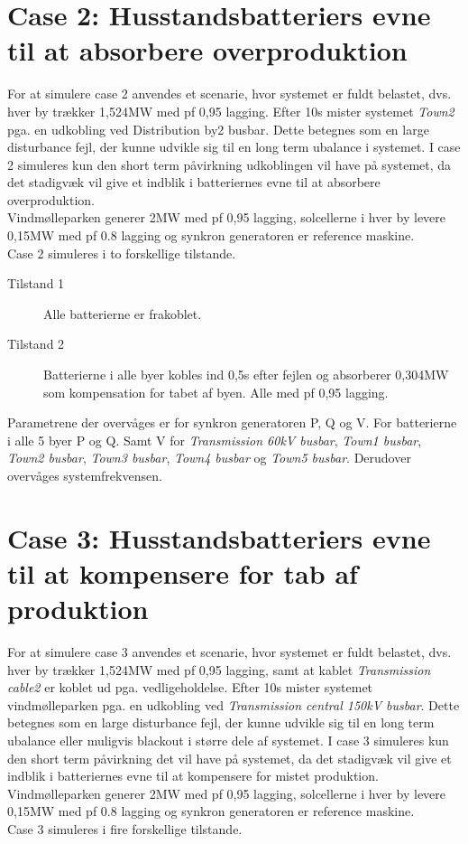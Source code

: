 \section{Case 2: Husstandsbatteriers evne til at absorbere overproduktion}
\label{SimCase2}
For at simulere case 2 anvendes et scenarie, hvor systemet er fuldt belastet, dvs. hver by trækker 1,524MW med pf 0,95 lagging. Efter 10s mister systemet \textit{Town2} pga. en udkobling ved Distribution by2 busbar. Dette betegnes som en large disturbance fejl, der kunne udvikle sig til en long term ubalance i systemet. I case 2 simuleres kun den short term påvirkning udkoblingen vil have på systemet, da det stadigvæk vil give et indblik i batteriernes evne til at absorbere overproduktion.\\
Vindmølleparken generer 2MW med pf 0,95 lagging, solcellerne i hver by levere 0,15MW med pf 0.8 lagging og synkron generatoren er reference maskine.\\
Case 2 simuleres i to forskellige tilstande.

\begin{description}
	\item[Tilstand 1] Alle batterierne er frakoblet.
	\item[Tilstand 2] Batterierne i alle byer kobles ind 0,5s efter fejlen og absorberer 0,304MW som kompensation for tabet af byen. Alle med pf 0,95 lagging.
\end{description}

Parametrene der overvåges er for synkron generatoren P, Q og V.
For batterierne i alle 5 byer P og Q. Samt V for \textit{Transmission 60kV busbar}, \textit{Town1 busbar}, \textit{Town2 busbar}, \textit{Town3 busbar}, \textit{Town4 busbar} og \textit{Town5 busbar}.
Derudover overvåges systemfrekvensen.

\section{Case 3: Husstandsbatteriers evne til at kompensere for tab af produktion}
\label{SimCase3}
For at simulere case 3 anvendes et scenarie, hvor systemet er fuldt belastet, dvs. hver by trækker 1,524MW med pf 0,95 lagging, samt at kablet \textit{Transmission cable2} er koblet ud pga. vedligeholdelse. Efter 10s mister systemet vindmølleparken pga. en udkobling ved \textit{Transmission central 150kV busbar}. Dette betegnes som en large disturbance fejl, der kunne udvikle sig til en long term ubalance eller muligvis blackout i større dele af systemet. I case 3 simuleres kun den short term påvirkning det vil have på systemet, da det stadigvæk vil give et indblik i batteriernes evne til at kompensere for mistet produktion.\\
Vindmølleparken generer 2MW med pf 0,95 lagging, solcellerne i hver by levere 0,15MW med pf 0.8 lagging og synkron generatoren er reference maskine.\\
Case 3 simuleres i fire forskellige tilstande.

